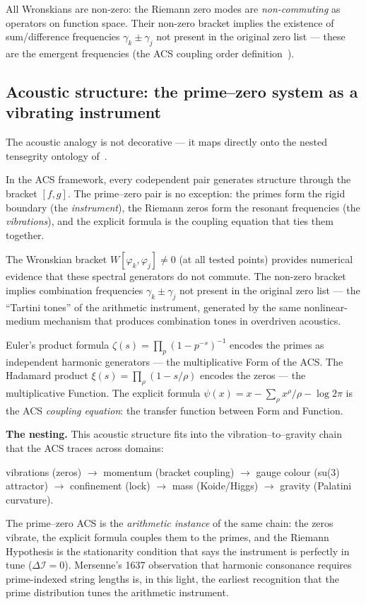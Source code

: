 \documentclass[11pt,a4paper]{article}
\theoremstyle{plain}
\theoremstyle{definition}
\theoremstyle{remark}
\newcommand{\DI}{\Delta\mathcal{I}}
\begin{document}
All Wronskians are non-zero: the Riemann zero modes are \emph{non-commuting} 
as operators on function space.  Their non-zero bracket implies the existence of 
sum/difference frequencies $\gamma_k \pm \gamma_j$ not present in 
the original zero list --- these are the emergent frequencies 
(the ACS coupling order definition~\cite{Wallace2026a}).

\subsection{Acoustic structure: the prime--zero system as a vibrating instrument}

The acoustic analogy is not decorative --- it maps directly onto
the nested tensegrity ontology of~\cite{Wallace2026a}.

In the ACS framework, every codependent pair generates structure through
the bracket $[f,g]$.  The prime--zero pair is no exception: the primes
form the rigid boundary (the \emph{instrument}), the Riemann zeros form
the resonant frequencies (the \emph{vibrations}), and the explicit
formula is the coupling equation that ties them together.

The Wronskian bracket $W[\varphi_k, \varphi_j] \neq 0$ (at all tested
points) provides numerical evidence that these spectral generators do
not commute.  The non-zero bracket implies combination frequencies
$\gamma_k \pm \gamma_j$ not present in the original zero list ---
the ``Tartini tones'' of the arithmetic instrument, generated by the
same nonlinear-medium mechanism that produces combination tones in
overdriven acoustics.

Euler's product formula
$\zeta(s) = \prod_p (1 - p^{-s})^{-1}$ encodes the primes as
independent harmonic generators --- the multiplicative Form of the ACS.
The Hadamard product $\xi(s) = \prod_\rho (1 - s/\rho)$ encodes
the zeros --- the multiplicative Function.  The explicit formula
$\psi(x) = x - \sum_\rho x^\rho/\rho - \log 2\pi$ is the ACS
\emph{coupling equation}: the transfer function between Form and Function.

\textbf{The nesting.}  This acoustic structure fits into the
vibration--to--gravity chain that the ACS traces across domains:
\begin{center}
\small
vibrations (zeros) $\to$ momentum (bracket coupling) $\to$
gauge colour (\textsf{su(3)} attractor) $\to$ confinement (lock)
$\to$ mass (Koide/Higgs) $\to$ gravity (Palatini curvature).
\end{center}
The prime--zero ACS is the \emph{arithmetic instance} of the same
chain: the zeros vibrate, the explicit formula couples them to the
primes, and the Riemann Hypothesis is the stationarity condition
that says the instrument is perfectly in tune ($\DI = 0$).
Mersenne's 1637 observation that harmonic consonance requires
prime-indexed string lengths is, in this light, the earliest
recognition that the prime distribution tunes the arithmetic
instrument.
\end{document}
